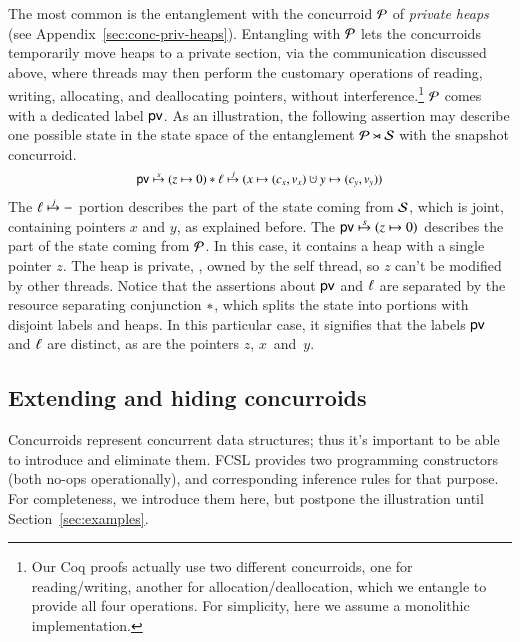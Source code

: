 The most common is the entanglement with the concurroid $\mathcal{P}$ of
\emph{private heaps} (see
Appendix~\ref{sec:conc-priv-heaps}). Entangling with $\mathcal{P}$ lets
the concurroids temporarily move heaps to a private section, via the
communication discussed above, where threads may then perform the
customary operations of reading, writing, allocating, and deallocating
pointers, without interference.\footnote{Our Coq proofs actually use
  two different concurroids, one for reading/writing, another for
  allocation/deallocation, which we entangle to provide all four
  operations. For simplicity, here we assume a monolithic
  implementation.}
%
$\mathcal{P}$ comes with a dedicated label $\mathsf{pv}$. As an illustration,
the following assertion may describe one possible state in the state
space of the entanglement $\mathcal{P} \rtimes \mathcal{S}$ with the
snapshot concurroid.
%
%
\[
{\small
\begin{array}{c}
\hpriv \spts (z \hpts 0) \lsep \hps \jpts (x \hpts (c_x, v_x) \hunion
y \hpts (c_y, v_y))
\end{array}
}
\]
%
%
The $\hps \jpts -$ portion describes the part of the state coming from
$\mathcal{S}$, which is joint, containing pointers $x$ and $y$, as
explained before. The $\hpriv \spts (z \hpts 0)$ describes the part of
the state coming from $\mathcal{P}$. In this case, it contains a heap
with a single pointer $z$. The heap is private, \ie, owned by the self
thread, so $z$ can't be modified by other threads.
%
Notice that the assertions about $\mathsf{pv}$ and $\ell$ are separated by
the resource separating conjunction $\ast$, which splits the state
into portions with disjoint labels and heaps. In this particular case,
it signifies that the labels $\mathsf{pv}$ and $\ell$ are distinct, as are
the pointers $z$, $x$~and~$y$.

%

\newcommand{\inject}[1]{[#1]}

\subsection{Extending and hiding concurroids}
Concurroids represent concurrent data structures; thus it's important
to be able to introduce and eliminate them. FCSL provides two
programming constructors (both no-ops operationally), and
corresponding inference rules for that purpose. For completeness, we
introduce them here, but postpone the illustration until
Section~\ref{sec:examples}.

